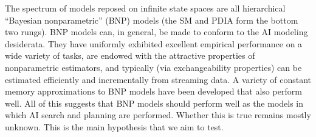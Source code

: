 \documentclass[12pt]{article}
\begin{document}
The spectrum of models reposed on infinite state spaces are all hierarchical ``Bayesian nonparametric'' (BNP) models (the SM and PDIA form the bottom two rungs).  
BNP models can, in general, be made to conform to the AI modeling desiderata.  They have uniformly exhibited excellent empirical performance on a wide variety of tasks, are endowed with the attractive properties of nonparametric estimators, and typically (via exchangeability properties) can be estimated efficiently and incrementally from streaming data.  A variety of constant memory approximations to BNP models have been developed that also perform well.  All of this suggests that BNP models should perform well as the models in which AI search and planning are performed.  Whether this is true remains mostly unknown.  This is the main hypothesis that we aim to test.

\vspace{.1cm}
\vspace{.1cm}
\end{document}
